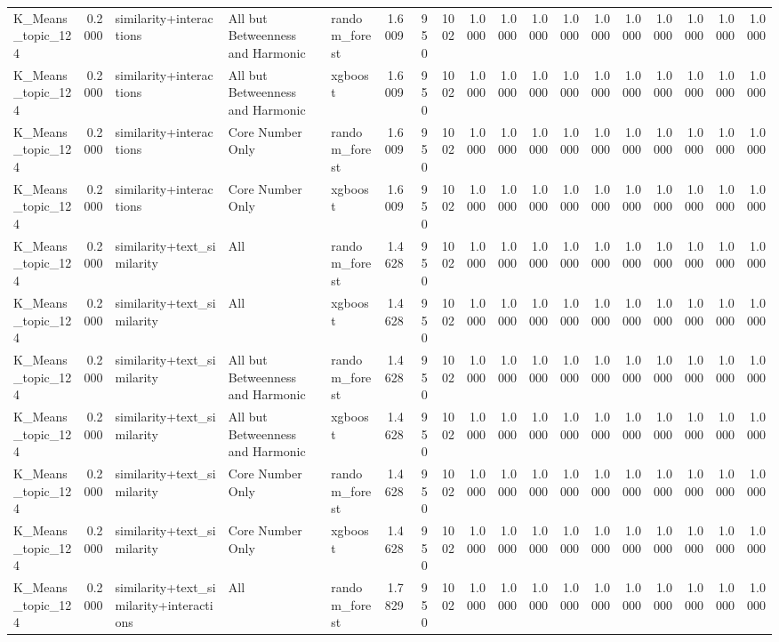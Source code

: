 \begin{tabular}{lrlllrrrrrrrrrrrrr}
K_Means_topic_124 & 0.2000 & similarity+interactions & All but Betweenness and Harmonic & random_forest & 1.6009 & 950 & 1002 & 1.0000 & 1.0000 & 1.0000 & 1.0000 & 1.0000 & 1.0000 & 1.0000 & 1.0000 & 1.0000 & 1.0000 \\
K_Means_topic_124 & 0.2000 & similarity+interactions & All but Betweenness and Harmonic & xgboost & 1.6009 & 950 & 1002 & 1.0000 & 1.0000 & 1.0000 & 1.0000 & 1.0000 & 1.0000 & 1.0000 & 1.0000 & 1.0000 & 1.0000 \\
K_Means_topic_124 & 0.2000 & similarity+interactions & Core Number Only & random_forest & 1.6009 & 950 & 1002 & 1.0000 & 1.0000 & 1.0000 & 1.0000 & 1.0000 & 1.0000 & 1.0000 & 1.0000 & 1.0000 & 1.0000 \\
K_Means_topic_124 & 0.2000 & similarity+interactions & Core Number Only & xgboost & 1.6009 & 950 & 1002 & 1.0000 & 1.0000 & 1.0000 & 1.0000 & 1.0000 & 1.0000 & 1.0000 & 1.0000 & 1.0000 & 1.0000 \\
K_Means_topic_124 & 0.2000 & similarity+text_similarity & All & random_forest & 1.4628 & 950 & 1002 & 1.0000 & 1.0000 & 1.0000 & 1.0000 & 1.0000 & 1.0000 & 1.0000 & 1.0000 & 1.0000 & 1.0000 \\
K_Means_topic_124 & 0.2000 & similarity+text_similarity & All & xgboost & 1.4628 & 950 & 1002 & 1.0000 & 1.0000 & 1.0000 & 1.0000 & 1.0000 & 1.0000 & 1.0000 & 1.0000 & 1.0000 & 1.0000 \\
K_Means_topic_124 & 0.2000 & similarity+text_similarity & All but Betweenness and Harmonic & random_forest & 1.4628 & 950 & 1002 & 1.0000 & 1.0000 & 1.0000 & 1.0000 & 1.0000 & 1.0000 & 1.0000 & 1.0000 & 1.0000 & 1.0000 \\
K_Means_topic_124 & 0.2000 & similarity+text_similarity & All but Betweenness and Harmonic & xgboost & 1.4628 & 950 & 1002 & 1.0000 & 1.0000 & 1.0000 & 1.0000 & 1.0000 & 1.0000 & 1.0000 & 1.0000 & 1.0000 & 1.0000 \\
K_Means_topic_124 & 0.2000 & similarity+text_similarity & Core Number Only & random_forest & 1.4628 & 950 & 1002 & 1.0000 & 1.0000 & 1.0000 & 1.0000 & 1.0000 & 1.0000 & 1.0000 & 1.0000 & 1.0000 & 1.0000 \\
K_Means_topic_124 & 0.2000 & similarity+text_similarity & Core Number Only & xgboost & 1.4628 & 950 & 1002 & 1.0000 & 1.0000 & 1.0000 & 1.0000 & 1.0000 & 1.0000 & 1.0000 & 1.0000 & 1.0000 & 1.0000 \\
K_Means_topic_124 & 0.2000 & similarity+text_similarity+interactions & All & random_forest & 1.7829 & 950 & 1002 & 1.0000 & 1.0000 & 1.0000 & 1.0000 & 1.0000 & 1.0000 & 1.0000 & 1.0000 & 1.0000 & 1.0000 \\

\end{tabular}

